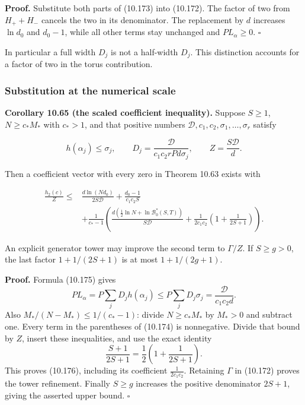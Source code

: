 \documentclass[
  11pt,
  a4paper,
]{article}
\begin{document}
\textbf{Proof.} Substitute both parts of (10.173) into (10.172). The
factor of two from \(H_++H_-\) cancels the two in its denominator. The
replacement by \(d\) increases \(\ln d_0\) and \(d_0-1\), while all
other terms stay unchanged and \(P L_\alpha\ge0\). \(\square\)

In particular a full width \(D_j\) is not a half-width \(D_j\). This
distinction accounts for a factor of two in the torus contribution.

\subsubsection{Substitution at the numerical
scale}\label{substitution-at-the-numerical-scale}

\textbf{Corollary 10.65 (the scaled coefficient inequality).} Suppose
\(S\ge1\), \(N\ge c_*M_*\) with \(c_*>1\), and that positive numbers
\(\mathcal D,c_1,c_2,\sigma_1,\ldots,\sigma_r\) satisfy

\[
h(\alpha_j)\le\sigma_j,\qquad
D_j=\frac{\mathcal D}{c_1c_2rPd\sigma_j},\qquad
Z=\frac{S\mathcal D}{d}.
\tag{10.175}
\]

Then a coefficient vector with every zero in Theorem 10.63 exists with

\[
\begin{aligned}
\frac{h_2(c)}Z\le&
\frac{d\ln(Nd_0)}{2S\mathcal D}
+\frac{d_0-1}{c_1c_2S}\\
&+\frac1{c_*-1}\left(
\frac{d(\frac12\ln N+\ln\mathcal B_0^*(S,T))}{S\mathcal D}
+\frac1{2c_1c_2}\left(1+\frac1{2S+1}\right)\right).
\end{aligned}
\tag{10.176}
\]

An explicit generator tower may improve the second term to \(\Gamma/Z\).
If \(S\ge g>0\), the last factor \(1+1/(2S+1)\) is at most
\(1+1/(2g+1)\).

\textbf{Proof.} Formula (10.175) gives \[
P L_\alpha=P\sum_jD_jh(\alpha_j)
\le P\sum_jD_j\sigma_j
=\frac{\mathcal D}{c_1c_2d}.
\] Also \(M_*/(N-M_*)\le1/(c_*-1)\): divide \(N\ge c_*M_*\) by \(M_*>0\)
and subtract one. Every term in the parentheses of (10.174) is
nonnegative. Divide that bound by \(Z\), insert these inequalities, and
use the exact identity \[
\frac{S+1}{2S+1}=\frac12\left(1+\frac1{2S+1}\right).
\] This proves (10.176), including its coefficient \(\frac1{2c_1c_2}\).
Retaining \(\Gamma\) in (10.172) proves the tower refinement. Finally
\(S\ge g\) increases the positive denominator \(2S+1\), giving the
asserted upper bound. \(\square\)
\end{document}
